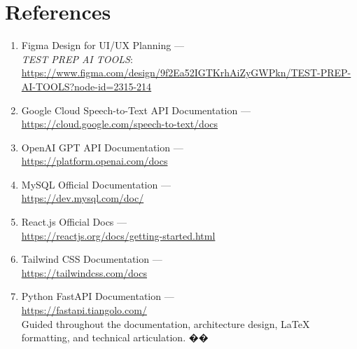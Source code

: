 \documentclass[a4paper,12pt]{article}
\begin{document}
\newpage
\section{References}

\vspace{0.5cm}

\begin{enumerate}
    \renewcommand{\labelenumi}{[\theenumi]}
    
    \item Figma Design for UI/UX Planning — \\
    \textit{TEST PREP AI TOOLS}: \\
    \url{https://www.figma.com/design/9f2Ea52IGTKrhAiZyGWPkn/TEST-PREP-AI-TOOLS?node-id=2315-214}

    \item Google Cloud Speech-to-Text API Documentation — \\
    \url{https://cloud.google.com/speech-to-text/docs}

    \item OpenAI GPT API Documentation — \\
    \url{https://platform.openai.com/docs}

    \item MySQL Official Documentation — \\
    \url{https://dev.mysql.com/doc/}

    \item React.js Official Docs — \\
    \url{https://reactjs.org/docs/getting-started.html}

    \item Tailwind CSS Documentation — \\
    \url{https://tailwindcss.com/docs}

    \item Python FastAPI Documentation — \\
    \url{https://fastapi.tiangolo.com/}
    \\
    
    Guided throughout the documentation, architecture design, LaTeX formatting, and technical articulation. ��
\end{enumerate}



\end{document}
